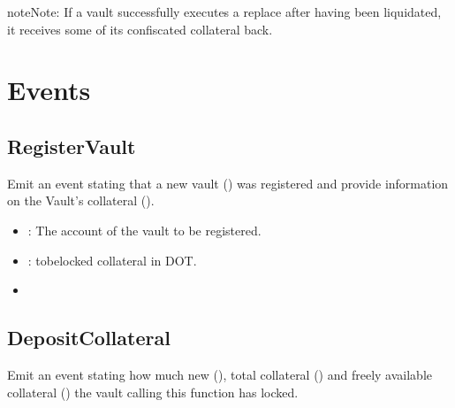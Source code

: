 \documentclass[a4paper,10pt,english]{sphinxmanual}
\begin{document}
\begin{sphinxadmonition}{note}{Note:}
If a vault successfully executes a replace after having been liquidated, it receives some of its confiscated collateral back.
\end{sphinxadmonition}


\section{Events}
\label{\detokenize{spec/vault-registry:events}}

\subsection{RegisterVault}
\label{\detokenize{spec/vault-registry:id39}}
Emit an event stating that a new vault () was registered and provide information on the Vault’s collateral ().



\begin{itemize}
\item {} 
: The account of the vault to be registered.

\item {} 
: to\sphinxhyphen{}be\sphinxhyphen{}locked collateral in DOT.

\end{itemize}

\begin{itemize}
\item {} 
{\hyperref[\detokenize{spec/vault-registry:registervault}]{}}

\end{itemize}


\subsection{DepositCollateral}
\label{\detokenize{spec/vault-registry:event-depositcollateral}}\label{\detokenize{spec/vault-registry:id40}}
Emit an event stating how much new (), total collateral () and freely available collateral () the vault calling this function has locked.
\end{document}
